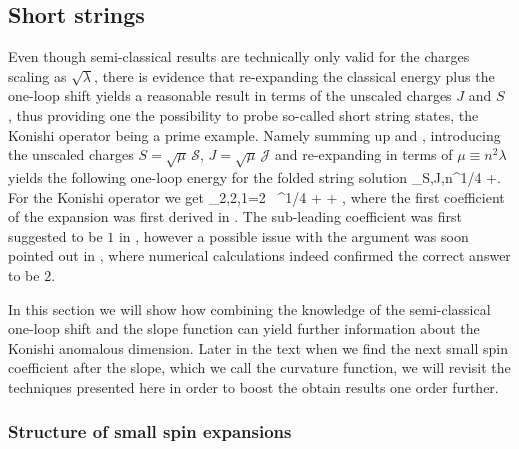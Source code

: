\subsection{Short strings}
\label{sec:short_strings}

Even though semi-classical results are technically only valid for the charges scaling as $\sqrt{\lambda}$, there is evidence that re-expanding the classical energy plus the one-loop shift yields a reasonable result in terms of the unscaled charges $J$ and $S$ \cite{Roiban:2009aa}, thus providing one the possibility to probe so-called short string states, the Konishi operator being a prime example.
Namely summing up  and , introducing the unscaled charges $S = \sqrt{\mu}\, \mathcal{S}$, $J = \sqrt{\mu}\, \mathcal{J}$ and re-expanding in terms of $\mu \equiv n^2 \lambda$ yields the following one-loop energy for the folded string solution \cite{Gromov:2011de}
\beq
\Delta_{S,J,n}\simeq{}\mu^{1/4}
+.
\eeq
For the Konishi operator we get
\beq
\Delta_{2,2,1}=2 \, \lambda^{1/4} + + ,
\eeq
where the first coefficient of the expansion was first derived in \cite{Gubser:2002tv}.
The sub-leading coefficient was first suggested to be $1$ in \cite{Roiban:2009aa}, however a possible issue with the argument was soon pointed out in \cite{Arutyunov:2009ax}, where numerical calculations indeed confirmed the correct answer to be $2$.

In this section we will show how combining the knowledge of the semi-classical one-loop shift  and the slope function  can yield further information about the Konishi anomalous dimension.
Later in the text when we find the next small spin coefficient after the slope, which we call the curvature function, we will revisit the techniques presented here in order to boost the obtain results one order further.

\subsubsection{Structure of small spin expansions}


